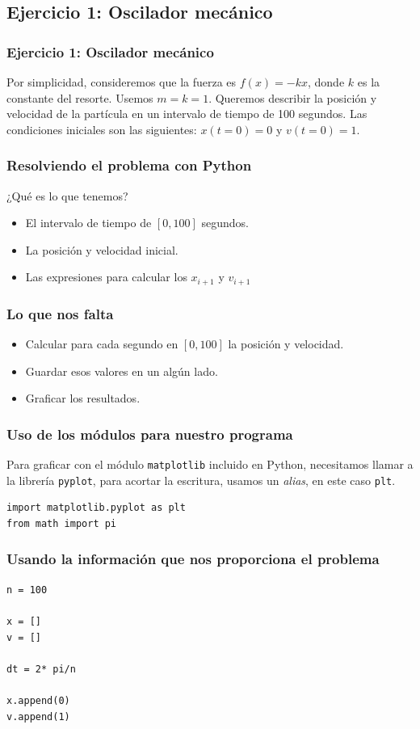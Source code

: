 \subsection{Ejercicio 1: Oscilador mecánico}
\begin{frame}
\frametitle{Ejercicio 1: Oscilador mecánico}
Por simplicidad, consideremos que la fuerza es $f(x) = -kx$, donde $k$ es la constante del resorte. Usemos $m=k=1$. Queremos describir la posición y velocidad de la partícula en un intervalo de tiempo de 100 segundos. Las condiciones iniciales son las siguientes: $x(t=0) = 0$ y $v(t=0) = 1$.
\end{frame}
\begin{frame}[<+->]
\frametitle{Resolviendo el problema con Python}
¿Qué es lo que tenemos?
\begin{itemize}
\item El intervalo de tiempo de $[0,100]$ segundos.
\item La posición y velocidad inicial.
\item Las expresiones para calcular los $x_{i+1}$ y $v_{i+1}$
\end{itemize}
\end{frame}
\begin{frame}[fragile]
\frametitle{Lo que nos falta}
\begin{itemize}[<+->]
\item Calcular para cada segundo en $[0,100]$ la posición y velocidad.
\item Guardar esos valores en un algún lado.
\item Graficar los resultados.
\end{itemize}
\end{frame}
\begin{frame}[fragile]
\frametitle{Uso de los módulos para nuestro programa}
Para graficar con el módulo \texttt{matplotlib} incluido en Python, necesitamos llamar a la librería \texttt{pyplot}, para acortar la escritura, usamos un \emph{alias}, en este caso \texttt{plt}.
\begin{lstlisting}
import matplotlib.pyplot as plt
from math import pi
\end{lstlisting}
\end{frame}
\begin{frame}[fragile]
\frametitle{Usando la información que nos proporciona el problema}
\begin{lstlisting}
n = 100

x = []
v = []

dt = 2* pi/n

x.append(0)
v.append(1)
\end{lstlisting}
\end{frame}
